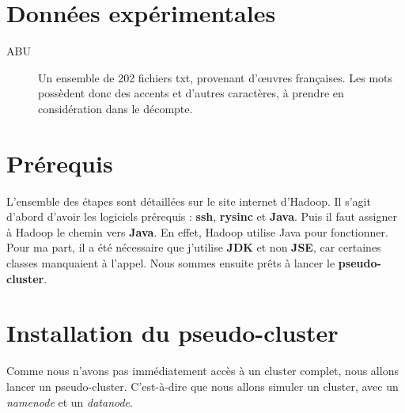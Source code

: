 \documentclass{article}
\begin{document}

\section{Donn\'{e}es exp\'{e}rimentales}

\begin{description}
\item[ABU]
Un ensemble de 202 fichiers txt, provenant d'\oe uvres fran\c{c}aises. Les mots poss\`{e}dent donc des accents et d'autres caract\`{e}res, \`{a} prendre en consid\'{e}ration dans le d\'{e}compte.
\end{description} 


\section{Pr\'{e}requis}

L'ensemble des \'{e}tapes sont d\'{e}taill\'{e}es sur le site internet d'Hadoop. Il s'agit d'abord d'avoir les logiciels pr\'{e}requis : \textbf{ssh}, \textbf{rysinc} et \textbf{Java}. Puis il faut assigner \`{a} Hadoop le chemin vers \textbf{Java}. En effet, Hadoop utilise Java pour fonctionner. Pour ma part, il a \'{e}t\'{e} n\'{e}cessaire que j'utilise \textbf{JDK} et non \textbf{JSE}, car certaines classes manquaient \`{a} l'appel. Nous sommes ensuite pr\^{e}ts \`{a} lancer le \textbf{pseudo-cluster}.


\section{Installation du pseudo-cluster}

Comme nous n'avons pas imm\'{e}diatement acc\`{e}s \`{a} un cluster complet, nous allons lancer un pseudo-cluster. C'est-\`{a}-dire que nous allons simuler un cluster, avec un \textit{namenode} et un \textit{datanode}.
\end{document}
